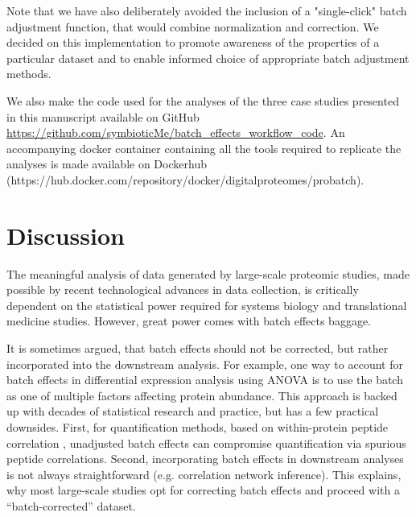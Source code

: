 \documentclass[num-refs]{wiley-article}
\begin{document}
Note that we have also deliberately avoided the inclusion of a "single-click" batch adjustment function, that would combine normalization and correction. We decided on this implementation to promote awareness of the properties of a particular dataset and to enable informed choice of appropriate batch adjustment methods.

We also make the code used for the analyses of the three case studies presented in this manuscript available on GitHub \url{https://github.com/symbioticMe/batch\_effects\_workflow\_code}. An accompanying docker container containing all the tools required to replicate the analyses is made available on Dockerhub (https://hub.docker.com/repository/docker/digitalproteomes/probatch).

\section{Discussion}

The meaningful analysis of data generated by large-scale proteomic studies, made possible by recent technological advances in data collection, is critically dependent on the statistical power required for systems biology and translational medicine studies. However, great power comes with batch effects baggage. 

It is sometimes argued, that batch effects should not be corrected, but rather incorporated into the downstream analysis. For example, one way to account for batch effects in differential expression analysis using ANOVA is to use the batch as one of multiple factors affecting protein abundance. This approach is backed up with decades of statistical research and practice, but has a few practical downsides. First, for quantification methods, based on within-protein peptide correlation \cite{Teo:2015aa}, unadjusted batch effects can compromise quantification via spurious peptide correlations. Second, incorporating batch effects in downstream analyses is not always straightforward (e.g. correlation network inference). This explains, why most large-scale studies opt for correcting batch effects and proceed with a “batch-corrected” dataset.
\end{document}
